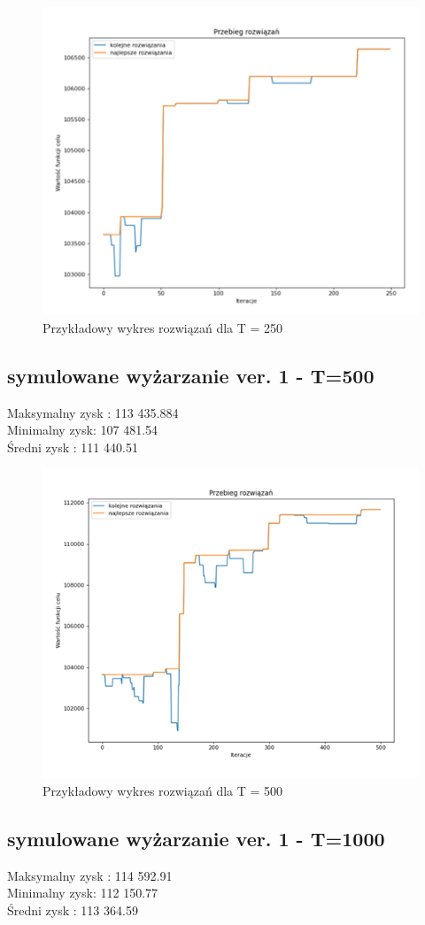 \documentclass{article}
\begin{document}
\begin{figure}[H]
	\centering
	\includegraphics[width=0.7\linewidth]{screens/AnneallingV1_250}
	\caption{Przykładowy wykres rozwiązań dla T = 250}
	\label{fig:anneallingv1250}
\end{figure}


\subsection{symulowane wyżarzanie ver. 1 - T=500}
Maksymalny zysk : 113 435.884\\
Minimalny zysk: 107 481.54\\
Średni zysk : 111 440.51\\

\begin{figure}[H]
	\centering
	\includegraphics[width=0.7\linewidth]{screens/AnneallingV1_500}
	\caption{Przykładowy wykres rozwiązań dla T = 500}
	\label{fig:anneallingv1500}
\end{figure}


\subsection{symulowane wyżarzanie ver. 1 - T=1000}
Maksymalny zysk : 114 592.91\\
Minimalny zysk: 112 150.77\\
Średni zysk : 113 364.59\\
\end{document}
